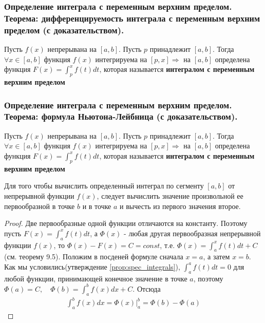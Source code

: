 \documentclass[10pt]{article}
\begin{document}
    \subsubsection{Определение интеграла с переменным верхним пределом. Теорема: дифференцируемость интеграла с переменным верхним пределом (с доказательством).}
    \begin{definition}
        Пусть $f(x)$ непрерывана на $[a, b]$. Пусть $p$ принадлежит $[a, b]$. Тогда $\forall x \in [a, b]$ функция $f(x)$ интегрируема на $[p, x] \Rightarrow$ на $[a, b]$ определена функция $F(x)=\int_p^x f(t) dt$, которая называется \textbf{интегралом с переменным верхним пределом}
    \end{definition}
    \begin{theorem}
    \end{theorem}
    


    \subsubsection{Определение интеграла с переменным верхним пределом. Теорема: формула Ньютона-Лейбница (с доказательством).}
    \begin{definition}
        Пусть $f(x)$ непрерывана на $[a, b]$. Пусть $p$ принадлежит $[a, b]$. Тогда $\forall x \in [a, b]$ функция $f(x)$ интегрируема на $[p, x] \Rightarrow$ на $[a, b]$ определена функция $F(x)=\int_p^x f(t) dt$, которая называется \textbf{интегралом с переменным верхним пределом}
    \end{definition}
    \begin{theorem}
        Для того чтобы вычислить определенный интеграл по сегменту $[a, b]$ от непрерывной функции $f(x)$, следует вычислить значение произвольной ее первообразной в точке $b$ и в точке $a$ и вычесть из первого значения второе.
    \end{theorem}
    \begin{proof}
        Две первообразные одной функции отличаются на константу. Поэтому пусть $F(x) = \int_a^x f(t) dt$, а $\Phi(x)$ - любая другая первообразная непрерывной функции $f(x)$, то $\Phi(x) - F(x) = C = const$, т.е. $\Phi(x) = \int_a^x f(t) dt + C$(см. теорему 9.5). Положим в посденей формуле сначала $x = a$, а затем $x = b$. Как мы условились(утверждение \ref{prop:spec_integrals}), $\int_a^a f(t) dt = 0$ для любой функции, принимающей конечное значение в точке $a$, поэтому $\Phi(a) = C,\quad \Phi(b) = \int_a^b f(x) dx + C$. Отсюда
        \begin{gather*}
            \int_a^b f(x) dx = \Phi(x)|^b_a = \Phi(b) - \Phi(a)
        \end{gather*} 
    \end{proof}
\end{document}
